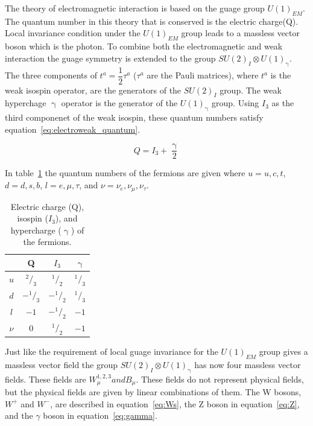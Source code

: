 The theory of electromagnetic interaction is based on the guage group $U(1)_{EM}$.  The quantum number in this theory that is conserved is the electric charge(Q).  Local invariance condition under the $U(1)_{EM}$ group leads to a massless vector boson which is the photon.  To combine both the electromagnetic and weak interaction the guage symmetry is extended to the group $ S U(2)_{I} \otimes U(1)_{\upgamma}$.  The three components of $t^{a} = \dfrac{1}{2}\tau^{a}$ ($\tau^{a}$ are the Pauli matrices), where $t^{a}$ is the weak isospin operator, are the generators of the $S U(2)_{I}$ group.  The weak hyperchage $\upgamma$ operator is the generator of the $ U(1)_{\upgamma}$ group. Using $I_{3}$ as the third componenet of the weak isospin, these quantum numbers satisfy equation~\ref{eq:electroweak_quantum}.

\begin{equation} Q = I_{3} + \dfrac{\upgamma}{2} \label{eq:electroweak_quantum}\end{equation}

In table~\ref{tab:QuantumNumbers} the quantum numbers of the fermions are given where $u = u,c,t$, $d = d,s,b$, $l = e,\mu,\tau$, and $\nu = \nu_{e}, \nu_{\mu}, \nu_{\tau}$.


\begin{center}
\begin{table}[htb]
\caption{%
  \small Electric charge (Q), isospin ($I_{3}$), and hypercharge ($\upgamma$) of the fermions.
}
\begin{center}
\begin{tabular}{ c c c c }
\hline & Q & $I_{3}$ & $\upgamma$ \\ \hline \hline
$u$   & $^2/_3$  & $^1/_2$  & $^1/_3$ \\
$d$   & $-^1/_3$ & $-^1/_2$ & $^1/_3$ \\ \hline \hline
$l$   & $-1$            & $-^1/_2$ & $-1$ \\
$\nu$ & $0$             & $^1/_2$  & $-1$ \\
\hline
\end{tabular}
\end{center}
\label{tab:QuantumNumbers}
\end{table}

\end{center}

Just like the requirement of local guage invariance for the $U(1)_{EM}$ group gives a massless vector field the group $ S U(2)_{I} \otimes U(1)_{\upgamma}$ has now four massless vector fields.  These fields are $W^{1,2,3}_{\mu} and B_{\mu}$.  These fields do not represent physical fields, but the physical fields are given by linear combinations of them.  The W bosons, $W^+$ and $W^-$, are described in equation~\ref{eq:Ws}, the Z boson in equation~\ref{eq:Z}, and the $\gamma$ boson in equation~\ref{eq:gamma}.

